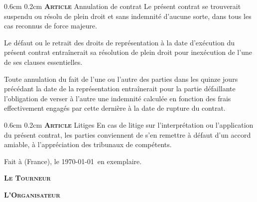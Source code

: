 \documentclass[a4paper,10pt]{article}
\makeatletter
\newcommand{\PR}{\textbf{\textsc{Le Tourneur}}}
\newcommand{\OR}{\textbf{\textsc{L'Organisateur}}}
\renewcommand\section{\@startsection{section}{1}{\z@}%
	{0.6cm}%
	{0.2cm}%
	{\noindent\large\bfseries\scshape Article }}
\renewcommand\subsection{\@startsection{subsection}{2}{1em}%
	{0.24cm}%
	{-0.5cm}%
	{\bfseries\scshape}}
\renewcommand\thesubsection{\thesection.\Roman{subsection})}
\makeatother
\begin{document}
\section{Annulation de contrat}
\label{sec:annulation}
Le pr\'esent contrat se trouverait suspendu ou r\'esolu de plein droit et
sans indemnit\'e d'aucune sorte, dans tous les cas reconnus de force
majeure.

Le d\'efaut ou le retrait des droits de repr\'esentation \`a la date
d'ex\'ecution du pr\'esent contrat entra\^inerait sa r\'esolution de plein
droit pour inex\'ecution de l'une de ses clauses essentielles.

Toute annulation du fait de l'une ou l'autre des parties dans les
quinze jours pr\'ec\'edant la date de la repr\'esentation entra\^inerait pour
la partie d\'efaillante l'obligation de verser \`a l'autre une indemnit\'e
calcul\'ee en fonction des frais effectivement engag\'es par cette
derni\`ere \`a la date de rupture du contrat.

\section{Litiges}
\label{sec:litiges}
En cas de litige sur l'interpr\'etation ou l'application du pr\'esent
contrat, les parties conviennent de s'en remettre \`a d\'efaut d'un accord
amiable, \`a l'appr\'eciation des tribunaux de compétents.

\vfill
Fait \`a \VILLEAMMD{} (France), le \today\ en \NBEX{} exemplaire.

\begin{minipage}[h!]{0.5\linewidth}
  \begin{center}
    \PR
  \end{center}
\end{minipage}
\begin{minipage}[h!]{0.5\linewidth}
  \begin{center}
    \OR
  \end{center}
\end{minipage}
\vspace{6cm}

\newpage
\appendix
\makeatletter
\renewcommand\section{\@startsection{section}{1}{\z@}%
	{1cm}%
	{0.2cm}%
	{\noindent\large\bfseries\scshape Annexe }}
\renewcommand\subsection{\@startsection{subsection}{2}{0.2em}%
	{0.24cm}%
	{0.1cm}%
	{\large\bfseries\scshape}}
\renewcommand\subsubsection{\@startsection{subsubsection}{3}{1em}%
	{0.24cm}%
	{-0.5cm}%
	{\bfseries\scshape}}
\makeatother
\renewcommand\thesubsection{\arabic{subsection}}
\end{document}
